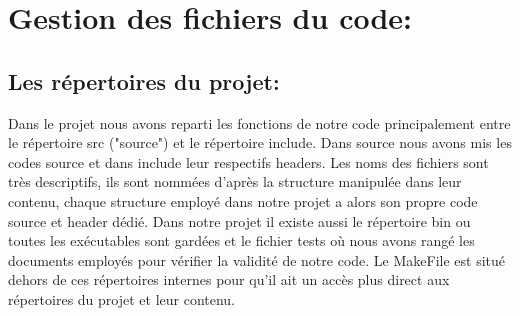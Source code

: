 \documentclass[11pt,francais]{article}
\begin{document}
\section{Gestion des fichiers du code:}
\subsection{Les répertoires du projet:}
	Dans le projet nous avons reparti les fonctions de notre code principalement entre le répertoire  src ("source") et le répertoire include. Dans source nous avons mis les codes source et dans include leur respectifs headers.
	Les noms des fichiers sont très descriptifs, ils sont nommées d'après la structure manipulée dans leur contenu, chaque structure employé dans notre projet a alors son propre code source et header dédié. \newline
	Dans notre projet il existe aussi le répertoire bin ou toutes les exécutables sont gardées et le fichier tests où nous avons rangé les documents employés pour vérifier la validité de notre code.
	Le MakeFile est situé dehors de ces répertoires internes pour qu'il ait un accès plus direct aux répertoires du projet et leur contenu.
	
\end{document}
